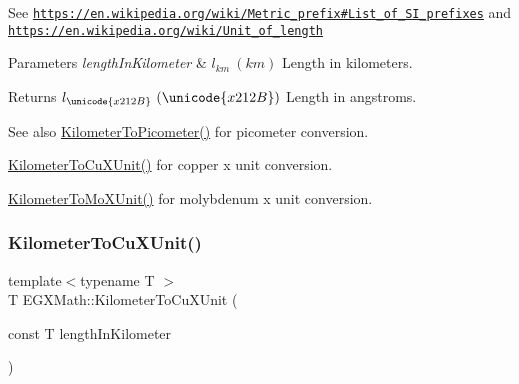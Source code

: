 See \href{https://en.wikipedia.org/wiki/Metric_prefix#List_of_SI_prefixes}{\tt https\+://en.\+wikipedia.\+org/wiki/\+Metric\+\_\+prefix\#\+List\+\_\+of\+\_\+\+S\+I\+\_\+prefixes} and \href{https://en.wikipedia.org/wiki/Unit_of_length}{\tt https\+://en.\+wikipedia.\+org/wiki/\+Unit\+\_\+of\+\_\+length} 
\begin{DoxyParams}{Parameters}
{\em length\+In\+Kilometer} & $ l_{km}\ (km)$ Length in kilometers. \\
\hline
\end{DoxyParams}
\begin{DoxyReturn}{Returns}
$ l_{\unicode{x212B}}\ (\unicode{x212B})$ Length in angstroms. 
\end{DoxyReturn}
\begin{DoxySeeAlso}{See also}
\mbox{\hyperlink{group___e_g_x_math-_conversions-_length_conversions-_kilometer-_s_i_ga73f6e033de3c41892f06cde1862f68d6}{Kilometer\+To\+Picometer()}} for picometer conversion. 

\mbox{\hyperlink{group___e_g_x_math-_conversions-_length_conversions-_kilometer-_non-_s_i_ga0614eb6a9e8bf1a9ba6cf51121f22083}{Kilometer\+To\+Cu\+X\+Unit()}} for copper x unit conversion. 

\mbox{\hyperlink{group___e_g_x_math-_conversions-_length_conversions-_kilometer-_non-_s_i_ga547782594ebd0cc3e565f6d32f9528df}{Kilometer\+To\+Mo\+X\+Unit()}} for molybdenum x unit conversion. 
\end{DoxySeeAlso}
\mbox{\label{group___e_g_x_math-_conversions-_length_conversions-_kilometer-_non-_s_i_ga0614eb6a9e8bf1a9ba6cf51121f22083}} 
\subsubsection{\texorpdfstring{Kilometer\+To\+Cu\+X\+Unit()}{KilometerToCuXUnit()}}
{\footnotesize\ttfamily template$<$typename T $>$ \\
T E\+G\+X\+Math\+::\+Kilometer\+To\+Cu\+X\+Unit (\begin{DoxyParamCaption}\item[{const T}]{length\+In\+Kilometer }\end{DoxyParamCaption})}



